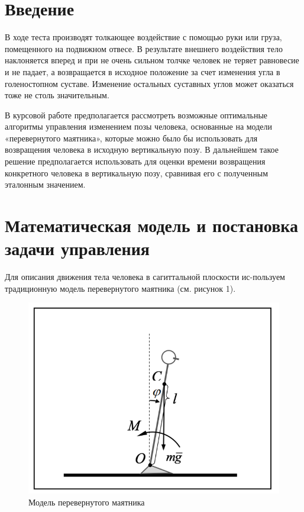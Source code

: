 \documentclass[a4paper,12pt]{article}
\theoremstyle{plain} %
\theoremstyle{definition} %
\theoremstyle{remark} %
\begin{document}
\thispagestyle{empty} %
\normalsize{
\newpage
\tableofcontents
\newpage

\section{Введение}
В ходе теста производят толкающее воздействие с помощью руки или
груза, помещенного на подвижном отвесе. В результате внешнего
воздействия тело наклоняется вперед и при не очень сильном толчке
человек не теряет равновесие и не падает, а возвращается в исходное
положение за счет изменения угла в голеностопном суставе. Изменение
остальных суставных углов может оказаться тоже не столь значительным.

В курсовой работе предполагается рассмотреть возможные оптимальные
алгоритмы управления изменением позы человека, основанные на модели
«перевернутого маятника», которые можно было бы использовать для
возвращения человека в исходную вертикальную позу. В дальнейшем
такое решение предполагается использовать для оценки времени
возвращения конкретного человека в вертикальную позу, сравнивая
его с полученным эталонным значением.
\newpage
\section{Математическая модель и постановка задачи управления}
Для описания движения тела человека в сагиттальной плоскости ис-пользуем традиционную модель перевернутого маятника (см. рисунок 1).

\begin{figure}[h!]
    \centering
    \includegraphics[width=1.00\linewidth]{pendulum.png}
    \caption{Модель перевернутого маятника}
    \label{fig:pendulum}
\end{figure}

}
\end{document}
